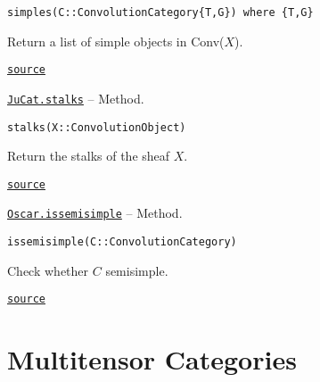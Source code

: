 \documentclass{memoir}
\begin{document}
\begin{adjustwidth}{2em}{0pt}


\begin{verbatim}
simples(C::ConvolutionCategory{T,G}) where {T,G}
\end{verbatim}

Return a list of simple objects in Conv(\(X\)).



\href{https://github.com/FabianMaeurer/JuCat.jl/blob/367390e2d003deec2ababa73caeab405e934bb35/src/structures/ConvolutionCategory/ConvolutionCategory.jl#L209-L213}{\texttt{source}}


\end{adjustwidth}
\hypertarget{16172694927088392840}{} 
\hyperlink{16172694927088392840}{\texttt{JuCat.stalks}}  -- {Method.}

\begin{adjustwidth}{2em}{0pt}


\begin{verbatim}
stalks(X::ConvolutionObject)
\end{verbatim}

Return the stalks of the sheaf \(X\).



\href{https://github.com/FabianMaeurer/JuCat.jl/blob/367390e2d003deec2ababa73caeab405e934bb35/src/structures/ConvolutionCategory/ConvolutionCategory.jl#L74-L78}{\texttt{source}}


\end{adjustwidth}
\hypertarget{11339324696069303458}{} 
\hyperlink{11339324696069303458}{\texttt{Oscar.issemisimple}}  -- {Method.}

\begin{adjustwidth}{2em}{0pt}


\begin{verbatim}
issemisimple(C::ConvolutionCategory)
\end{verbatim}

Check whether \(C\) semisimple.



\href{https://github.com/FabianMaeurer/JuCat.jl/blob/367390e2d003deec2ababa73caeab405e934bb35/src/structures/ConvolutionCategory/ConvolutionCategory.jl#L58-L62}{\texttt{source}}


\end{adjustwidth}

\part{Multitensor Categories}
\end{document}
